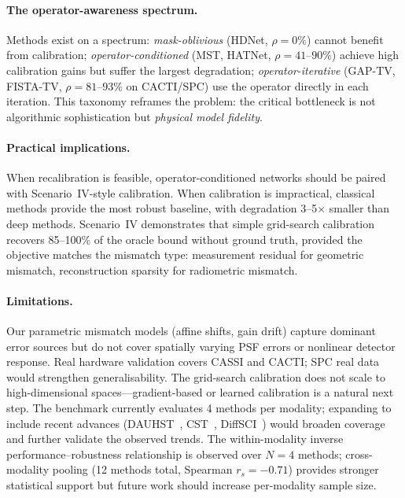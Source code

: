 \documentclass[runningheads]{llncs}
\begin{document}
\paragraph{The operator-awareness spectrum.}
Methods exist on a spectrum: \emph{mask-oblivious} (HDNet, $\rho{=}0\%$) cannot benefit from calibration; \emph{operator-conditioned} (MST, HATNet, $\rho{=}41$--$90\%$) achieve high calibration gains but suffer the largest degradation; \emph{operator-iterative} (GAP-TV, FISTA-TV, $\rho{=}81$--$93\%$ on CACTI/SPC) use the operator directly in each iteration.
This taxonomy reframes the problem: the critical bottleneck is not algorithmic sophistication but \emph{physical model fidelity}.

\paragraph{Practical implications.}
When recalibration is feasible, operator-conditioned networks should be paired with Scenario~IV-style calibration.
When calibration is impractical, classical methods provide the most robust baseline, with degradation 3--5$\times$ smaller than deep methods.
Scenario~IV demonstrates that simple grid-search calibration recovers 85--100\% of the oracle bound without ground truth, provided the objective matches the mismatch type: measurement residual for geometric mismatch, reconstruction sparsity for radiometric mismatch.

\paragraph{Limitations.}
Our parametric mismatch models (affine shifts, gain drift) capture dominant error sources but do not cover spatially varying PSF errors or nonlinear detector response.
Real hardware validation covers CASSI and CACTI; SPC real data would strengthen generalisability.
The grid-search calibration does not scale to high-dimensional spaces---gradient-based or learned calibration is a natural next step.
The benchmark currently evaluates 4 methods per modality; expanding to include recent advances (DAUHST~\cite{cai2022dauhst}, CST~\cite{cai2022cst}, DiffSCI~\cite{meng2024diffsci}) would broaden coverage and further validate the observed trends.
The within-modality inverse performance--robustness relationship is observed over $N{=}4$ methods; cross-modality pooling (12 methods total, Spearman $r_s{=}{-}0.71$) provides stronger statistical support but future work should increase per-modality sample size.
\end{document}
